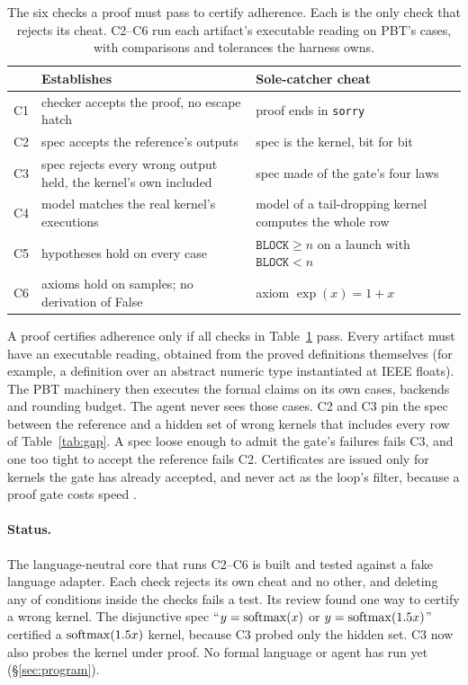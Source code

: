 \begin{table}[t]
\centering
\small
\setlength{\tabcolsep}{3pt}
\begin{tabular}{@{}lp{}p{}@{}}
\toprule
& Establishes & Sole-catcher cheat \\
\midrule
C1 & checker accepts the proof, no escape hatch & proof ends in \texttt{sorry} \\
C2 & spec accepts the reference's outputs & spec is the kernel, bit for bit \\
C3 & spec rejects every wrong output held, the kernel's own included & spec made of the gate's four laws \\
C4 & model matches the real kernel's executions & model of a tail-dropping kernel computes the whole row \\
C5 & hypotheses hold on every case & $\texttt{BLOCK} \ge n$ on a launch with $\texttt{BLOCK} < n$ \\
C6 & axioms hold on samples; no derivation of \textsf{False} & axiom $\exp(x) = 1 + x$ \\
\bottomrule
\end{tabular}
\caption{The six checks a proof must pass to certify adherence. Each is the only check
  that rejects its cheat. C2--C6 run each artifact's executable reading on PBT's
  cases, with comparisons and tolerances the harness owns.}
\label{tab:checks}
\end{table}

A proof certifies adherence only if all \formalChecks{} checks in Table~\ref{tab:checks}
pass. Every artifact must have an executable reading, obtained from the proved
definitions themselves (for example, a definition over an abstract numeric type
instantiated at IEEE floats). The PBT machinery then executes the formal claims on its
own cases, backends and rounding budget. The agent never sees those cases. C2 and C3
pin the spec between the reference and a hidden set of wrong kernels that includes
every row of Table~\ref{tab:gap}. A spec loose enough to admit the gate's failures fails
C3, and one too tight to accept the reference fails C2. Certificates are issued only for
kernels the gate has already accepted, and never act as the loop's filter, because a
proof gate costs speed \citep{costa2026aicompiler}.

\paragraph{Status.} The language-neutral core that runs C2--C6 is built and tested
against a fake language adapter. Each check rejects its own cheat and no other, and
deleting any of \formalRemovedConditions{} conditions inside the checks fails a test.
Its review found one way to certify a wrong kernel. The disjunctive spec
``$y = \operatorname{softmax}(x)$ or $y = \operatorname{softmax}(1.5x)$'' certified a $\operatorname{softmax}(1.5x)$ kernel,
because C3 probed only the hidden set. C3 now also probes the kernel under proof. No
formal language or agent has run yet (\S\ref{sec:program}).
